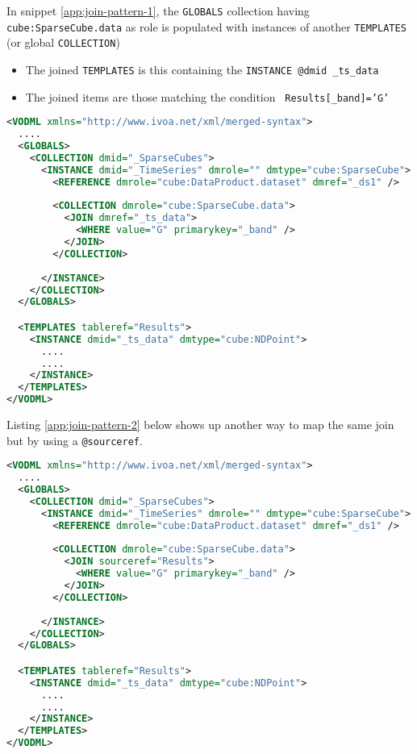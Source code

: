 
In snippet \ref{app:join-pattern-1}, the \texttt{GLOBALS} collection having \texttt{cube:SparseCube.data} as role is populated with  instances of another \texttt{TEMPLATES} (or global \texttt{COLLECTION})
\begin{itemize}
  \item The joined \texttt{TEMPLATES} is this containing the  \texttt{INSTANCE \texttt{@dmid} \_ts\_data}
  \item The joined items are those matching the condition  \texttt{ Results[\_band]='G'}
\end{itemize}

\begin{lstlisting}[label={app:join-pattern-1},caption={Joining a global \texttt{COLLECTION} with a \texttt{TEMPLATES}  identified by a \texttt{@dmid} \texttt{@dmref} pair},language=XML]
<VODML xmlns="http://www.ivoa.net/xml/merged-syntax">
  ....
  <GLOBALS>
    <COLLECTION dmid="_SparseCubes">
      <INSTANCE dmid="_TimeSeries" dmrole="" dmtype="cube:SparseCube">
        <REFERENCE dmrole="cube:DataProduct.dataset" dmref="_ds1" />
        
        <COLLECTION dmrole="cube:SparseCube.data">
          <JOIN dmref="_ts_data">
            <WHERE value="G" primarykey="_band" />
          </JOIN>
        </COLLECTION>
        
      </INSTANCE>
    </COLLECTION>
  </GLOBALS>

  <TEMPLATES tableref="Results">
    <INSTANCE dmid="_ts_data" dmtype="cube:NDPoint">
      ....
      ....
    </INSTANCE>
  </TEMPLATES>
</VODML>
\end{lstlisting}  

Listing \ref{app:join-pattern-2} below shows up another way to map the same join but by using a \texttt{@sourceref}.

\begin{lstlisting}[label={app:join-pattern-2},caption={Joining a global \texttt{COLLECTION} with a \texttt{TEMPLATES}  identified by a @sourceref},language=XML]
<VODML xmlns="http://www.ivoa.net/xml/merged-syntax">
  ....
  <GLOBALS>
    <COLLECTION dmid="_SparseCubes">
      <INSTANCE dmid="_TimeSeries" dmrole="" dmtype="cube:SparseCube">
        <REFERENCE dmrole="cube:DataProduct.dataset" dmref="_ds1" />
        
        <COLLECTION dmrole="cube:SparseCube.data">
          <JOIN sourceref="Results">
            <WHERE value="G" primarykey="_band" />
          </JOIN>
        </COLLECTION>
        
      </INSTANCE>
    </COLLECTION>
  </GLOBALS>

  <TEMPLATES tableref="Results">
    <INSTANCE dmid="_ts_data" dmtype="cube:NDPoint">
      ....
      ....
    </INSTANCE>
  </TEMPLATES>
</VODML>
\end{lstlisting}  

